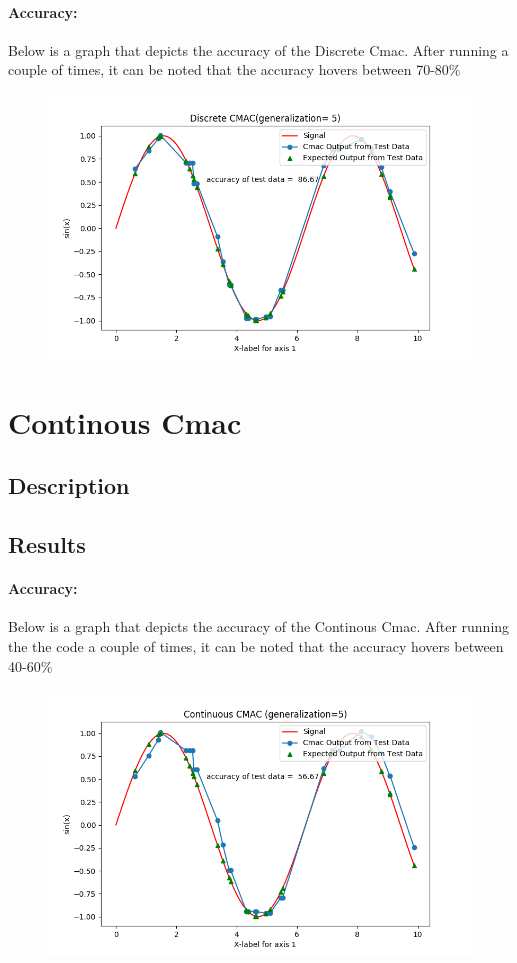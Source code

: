 \documentclass{article}
\begin{document}
  \paragraph{Accuracy:}
    Below is a graph that depicts the accuracy of the Discrete Cmac. After running a couple of times, it can 
    be noted that the accuracy hovers between 70-80\%
  \begin{figure}[h!]
    \includegraphics[scale=0.7]{./Results/discreteAccuracy.png}
  \end{figure}
\newpage 
\section{Continous Cmac}
\subsection{Description}
\subsection{Results}
  \paragraph{Accuracy:}
    Below is a graph that depicts the accuracy of the Continous Cmac. After running the the code a couple of times, it can
    be noted that the accuracy hovers between 40-60\%
  \begin{figure}[h!]
     \includegraphics[scale=0.65]{./Results/continousAccuracy.png}
  \end{figure}
\end{document}
